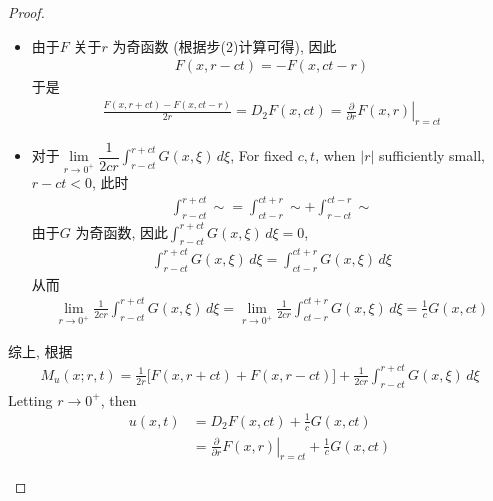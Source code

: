 \begin{thm}
\begin{proof}
\begin{enumerate}
\begin{enumerate}
					\begin{itemize}
						\item 由于$F$ 关于$r$ 为奇函数 (根据步(2)计算可得), 因此
						\begin{align*}
							F(x , r - ct) = -F(x , ct - r)
						\end{align*}
						于是
						\begin{align*}
							\frac{F(x , r + ct) - F(x , ct - r)}{2r} 
							= D_2 F(x , ct) 
							= \left. \frac{\partial}{\partial r} F(x , r) \right|_{r = ct}
						\end{align*}
						
						\newpage
						
						\item 对于$\underset{r \to 0^+}{\lim} \dfrac{1}{2cr} \int_{r - ct}^{r + ct} G(x , \xi) \, d\xi$, For fixed $c , t$, when $| r |$ sufficiently small, $r - ct < 0$, 此时
						\begin{align*}
							\int_{r - ct}^{r + ct} \sim 
							= \int_{ct - r}^{ct + r} \sim + \int_{r - ct}^{ct - r} \sim
						\end{align*}
						由于$G$ 为奇函数, 因此$\int_{r - ct}^{r + ct} G(x , \xi) \, d\xi = 0$, 
						\begin{align*}
							\int_{r - ct}^{r + ct} G(x , \xi) \, d\xi 
							= \int_{ct - r}^{ct + r} G(x , \xi) \, d\xi
						\end{align*}
						从而
						\begin{align*}
							\lim_{r \to 0^+} \frac{1}{2cr} \int_{r - ct}^{r + ct} G(x , \xi) \, d\xi 
							= \lim_{r \to 0^+} \frac{1}{2cr} \int_{ct - r}^{ct + r} G(x , \xi) \, d\xi 
							= \frac{1}{c} G(x , ct)
						\end{align*}
					\end{itemize}
					
					\vspace*{2em}
					
					综上, 根据
					\begin{align*}
						M_{u}(x ; r , t) 
						= \frac{1}{2r} \Big[ F(x , r + ct) + F(x , r - ct) \Big] + \frac{1}{2cr} \int_{r - ct}^{r + ct} G(x , \xi) \, d\xi
					\end{align*}
					Letting $r \to 0^+$, then 
					\begin{align*}
						u(x , t) 
						&= D_2 F(x , ct) + \frac{1}{c} G(x , ct) \\
						&= \left. \frac{\partial}{\partial r} F(x , r) \right|_{r = ct} + \frac{1}{c} G(x , ct)
					\end{align*}
					

\end{enumerate}
\end{enumerate}
\end{proof}
\end{thm}
